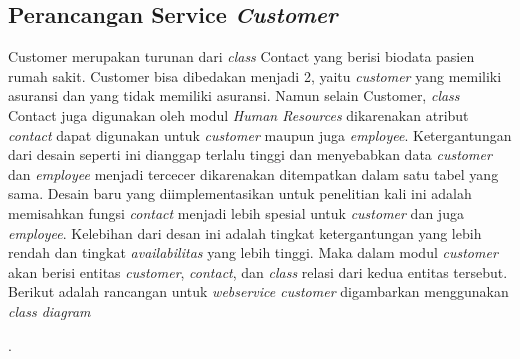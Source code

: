 \subsection{Perancangan Service \textit{Customer}}
Customer merupakan turunan dari \textit{class} Contact yang berisi biodata pasien rumah sakit. Customer bisa dibedakan menjadi 2, yaitu \textit{customer} yang memiliki asuransi dan yang tidak memiliki asuransi. Namun selain Customer, \textit{class} Contact juga digunakan oleh modul \textit{Human Resources} dikarenakan atribut \textit{contact} dapat digunakan untuk \textit{customer} maupun juga \textit{employee}. Ketergantungan dari desain seperti ini dianggap terlalu tinggi dan menyebabkan data \textit{customer} dan \textit{employee} menjadi tercecer dikarenakan ditempatkan dalam satu tabel yang sama.
Desain baru yang diimplementasikan untuk penelitian kali ini adalah memisahkan fungsi \textit{contact} menjadi lebih spesial untuk \textit{customer} dan juga \textit{employee}. Kelebihan dari desan ini adalah tingkat ketergantungan yang lebih rendah dan tingkat \textit{availabilitas} yang lebih tinggi. Maka dalam modul \textit{customer} akan berisi entitas \textit{customer}, \textit{contact}, dan \textit{class} relasi dari kedua entitas tersebut.\\
Berikut adalah rancangan untuk \textit{webservice customer} digambarkan menggunakan \textit{class diagram}

\begin{adjustbox}{width=1\textwidth}
	\begin{minipage}{\linewidth}
		.
	\end{minipage}
\end{adjustbox}
